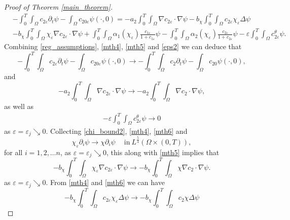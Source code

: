\documentclass[a4paper,10pt]{article}
\theoremstyle{definition}
\begin{document}
\begin{proof}[Proof of Theorem \ref{main_theorem}]
\begin{align}
   \label{mthdefeq2}
  \nonumber  & - \int_0^T \int_\Omega c_{2\varepsilon} \partial_t \psi - \int_\Omega c_{20\varepsilon} \psi(\cdot, 0) = - a_2 \int_0^T \int_\Omega \nabla c_{2\varepsilon} \cdot \nabla \psi  - b_\chi \int_0^T \int_\Omega c_{2\varepsilon} \chi_\varepsilon \Delta \psi \\[5pt]
  & - b_\chi \int_0^T \int_\Omega \chi_\varepsilon \nabla c_{2 \varepsilon} \cdot \nabla \psi + \int_0^T \int_\Omega \alpha_1(\chi_\varepsilon )\frac{c_{1\varepsilon}}{1 + c_{1\varepsilon}} \psi - \int_0^T \int_\Omega \alpha_2(\chi_\varepsilon )\frac{c_{2\varepsilon}}{1 + c_{2\varepsilon}} \psi - \varepsilon \int_0^T \int_\Omega c_{2\varepsilon}^\theta \psi.
\end{align}
Combining \eqref{reg_assumptions}, \eqref{mth4}, \eqref{mth5} and \eqref{eps2} we can deduce that
\begin{equation}
  \label{c2weak_sol1}
  - \int_0^T \int_\Omega c_{2\varepsilon} \partial_t \psi - \int_\Omega c_{20\varepsilon} \psi(\cdot, 0) \to - \int_0^T \int_\Omega c_{2} \partial_t \psi - \int_\Omega c_{20} \psi(\cdot, 0),
\end{equation}
and
\begin{equation}
\label{c2weak_sol2}
 - a_2 \int_0^T \int_\Omega \nabla c_{2\varepsilon} \cdot \nabla \psi \to  - a_2 \int_0^T \int_\Omega \nabla c_{2} \cdot \nabla \psi,
\end{equation}
as well as
\begin{align}
\label{c2weak_sol3}
 - \varepsilon \int_0^T \int_\Omega c_{2\varepsilon}^\theta \psi \to 0
\end{align}
as $\varepsilon = \varepsilon_j \searrow 0$. Collecting \eqref{chi_bound2}, \eqref{mth4}, \eqref{mth6} and \cite[Lemma 3.9]{tao2021global}
\begin{equation*}
   \chi_\varepsilon \partial_i \psi \to \chi \partial_i \psi \quad ~\text{in}~ L^{\frac{5}{4}}(\Omega \times (0, T)),
\end{equation*}
for all $i = 1, 2, \ldots n$, as $\varepsilon = \varepsilon_j \searrow 0$, this along with \eqref{mth5} implies that
\begin{equation}
\label{c2weak1}
  - b_\chi \int_0^T \int_\Omega \chi_\varepsilon \nabla c_{2 \varepsilon} \cdot \nabla \psi \to  - b_\chi \int_0^T \int_\Omega \chi \nabla c_{2} \cdot \nabla \psi.
\end{equation}
as $\varepsilon = \varepsilon_j \searrow 0$. From \eqref{mth4} and \eqref{mth6} we can have
\begin{equation}
\label{c2weak2}
   - b_\chi \int_0^T \int_\Omega c_{2\varepsilon} \chi_\varepsilon \Delta \psi \to  - b_\chi \int_0^T \int_\Omega c_{2} \chi \Delta \psi

\end{equation}
\end{proof}
\end{document}
